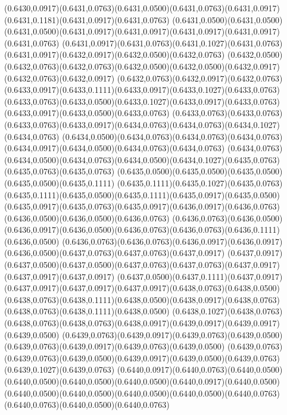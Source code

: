 (0.6430,0.0917)(0.6431,0.0763)(0.6431,0.0500)(0.6431,0.0763)(0.6431,0.0917)(0.6431,0.1181)(0.6431,0.0917)(0.6431,0.0763)
(0.6431,0.0500)(0.6431,0.0500)(0.6431,0.0500)(0.6431,0.0917)(0.6431,0.0917)(0.6431,0.0917)(0.6431,0.0917)(0.6431,0.0763)
(0.6431,0.0917)(0.6431,0.0763)(0.6431,0.1027)(0.6431,0.0763)(0.6431,0.0917)(0.6432,0.0917)(0.6432,0.0500)(0.6432,0.0763)
(0.6432,0.0500)(0.6432,0.0763)(0.6432,0.0763)(0.6432,0.0500)(0.6432,0.0500)(0.6432,0.0917)(0.6432,0.0763)(0.6432,0.0917)
(0.6432,0.0763)(0.6432,0.0917)(0.6432,0.0763)(0.6433,0.0917)(0.6433,0.1111)(0.6433,0.0917)(0.6433,0.1027)(0.6433,0.0763)
(0.6433,0.0763)(0.6433,0.0500)(0.6433,0.1027)(0.6433,0.0917)(0.6433,0.0763)(0.6433,0.0917)(0.6433,0.0500)(0.6433,0.0763)
(0.6433,0.0763)(0.6433,0.0763)(0.6433,0.0763)(0.6433,0.0917)(0.6434,0.0763)(0.6434,0.0763)(0.6434,0.1027)(0.6434,0.0763)
(0.6434,0.0500)(0.6434,0.0763)(0.6434,0.0763)(0.6434,0.0763)(0.6434,0.0917)(0.6434,0.0500)(0.6434,0.0763)(0.6434,0.0763)
(0.6434,0.0763)(0.6434,0.0500)(0.6434,0.0763)(0.6434,0.0500)(0.6434,0.1027)(0.6435,0.0763)(0.6435,0.0763)(0.6435,0.0763)
(0.6435,0.0500)(0.6435,0.0500)(0.6435,0.0500)(0.6435,0.0500)(0.6435,0.1111)
\PST@Solid(0.6435,0.1111)(0.6435,0.1027)(0.6435,0.0763)(0.6435,0.1111)(0.6435,0.0500)(0.6435,0.1111)(0.6435,0.0917)(0.6435,0.0500)
(0.6435,0.0917)(0.6435,0.0763)(0.6435,0.0917)(0.6436,0.0917)(0.6436,0.0763)(0.6436,0.0500)(0.6436,0.0500)(0.6436,0.0763)
(0.6436,0.0763)(0.6436,0.0500)(0.6436,0.0917)(0.6436,0.0500)(0.6436,0.0763)(0.6436,0.0763)(0.6436,0.1111)(0.6436,0.0500)
(0.6436,0.0763)(0.6436,0.0763)(0.6436,0.0917)(0.6436,0.0917)(0.6436,0.0500)(0.6437,0.0763)(0.6437,0.0763)(0.6437,0.0917)
(0.6437,0.0917)(0.6437,0.0500)(0.6437,0.0500)(0.6437,0.0763)(0.6437,0.0763)(0.6437,0.0917)(0.6437,0.0917)(0.6437,0.0917)
(0.6437,0.0500)(0.6437,0.1111)(0.6437,0.0917)(0.6437,0.0917)(0.6437,0.0917)(0.6437,0.0917)(0.6438,0.0763)(0.6438,0.0500)
(0.6438,0.0763)(0.6438,0.1111)(0.6438,0.0500)(0.6438,0.0917)(0.6438,0.0763)(0.6438,0.0763)(0.6438,0.1111)(0.6438,0.0500)
(0.6438,0.1027)(0.6438,0.0763)(0.6438,0.0763)(0.6438,0.0763)(0.6438,0.0917)(0.6439,0.0917)(0.6439,0.0917)(0.6439,0.0500)
(0.6439,0.0763)(0.6439,0.0917)(0.6439,0.0763)(0.6439,0.0500)(0.6439,0.0763)(0.6439,0.0917)(0.6439,0.0763)(0.6439,0.0500)
(0.6439,0.0763)(0.6439,0.0763)(0.6439,0.0500)(0.6439,0.0917)(0.6439,0.0500)(0.6439,0.0763)(0.6439,0.1027)(0.6439,0.0763)
(0.6440,0.0917)(0.6440,0.0763)(0.6440,0.0500)(0.6440,0.0500)(0.6440,0.0500)(0.6440,0.0500)(0.6440,0.0917)(0.6440,0.0500)
(0.6440,0.0500)(0.6440,0.0500)(0.6440,0.0500)(0.6440,0.0500)(0.6440,0.0763)(0.6440,0.0763)(0.6440,0.0500)(0.6440,0.0763)
